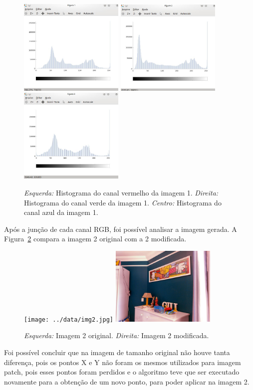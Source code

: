 \begin{figure}[h]
    \centering
    \includegraphics[width=5cm]{h1.jpg}
    \includegraphics[width=5cm]{h2.jpg}
    \includegraphics[width=5cm]{h3.jpg}     
    \caption{\emph{Esquerda:} Histograma do canal vermelho da imagem 1. \emph{Direita:} Histograma do canal verde da imagem 1. \emph{Centro:} Histograma do canal azul da imagem 1.}
    \label{fig:result9}
\end{figure}

Após a junção de cada canal RGB, foi possível analisar a imagem gerada. A Figura~\ref{fig:result10} compara a imagem 2 original com a 2 modificada.


\begin{figure}[h]
    \centering
    \texttt{[image: ../data/img2.jpg]}
    \includegraphics[width=5cm]{../code/imagem_2_melhorada.jpg}
    \caption{\emph{Esquerda:} Imagem 2 original. \emph{Direita:} Imagem 2 modificada.}
    \label{fig:result10}
\end{figure}

Foi possível concluir que na imagem de tamanho original não houve tanta diferença, pois os pontos X e Y não foram os mesmos utilizados para imagem patch, pois esses pontos foram perdidos e o algoritmo teve que ser executado novamente para a obtenção de um novo ponto, para poder aplicar na imagem 2. 

\newpage




